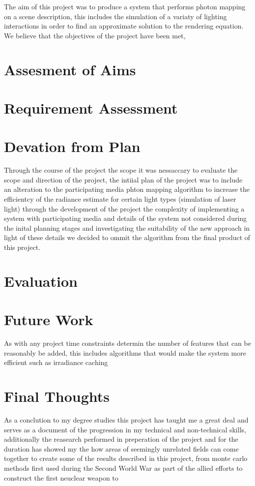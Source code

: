 The aim of this project was to produce a system that performs photon mapping on a scene description, this includes the simulation of
a variaty of lighting interactions in order to find an approximate solution to the rendering equation. We believe that the objectives
of the project have been met, 

\section{Assesment of Aims}

\section{Requirement Assessment}

\section{Devation from Plan}
Through the course of the project the scope it was nessaccary to evaluate the scope and direction of the project, the intiial plan
of the project was to include an alteration to the participating media phton mapping algorithm to increase the efficientcy of the
radiance estimate for certain light types (simulation of laser light) through the development of the project the complexity of
implementing a system with participating media and details of the system not considered during the inital planning stages and
investigating the suitability of the new approach in light of these details we decided to ommit the algorithm from the final product
of this project.

\section{Evaluation}

\section{Future Work}
As with any project time constraints determin the number of features that can be reasonably be added, this includes algorithms that
would make the system more efficient such as irradiance caching

\section{Final Thoughts}
As a conclution to my degree studies this project has taught me a great deal and serves as a document of the progression in my technical and
non-technical skills, additionally the reasearch performed in preperation of the project and for the duration has showed my the
how areas of seemingly unrelated fields can come together to create some of the results described in this project, from monte carlo methods
first used during the Second World War as part of the allied efforts to construct the first neuclear weapon to 
